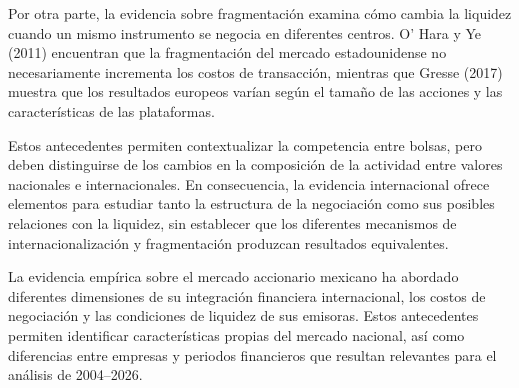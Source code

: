 Por otra parte, la evidencia sobre fragmentación examina cómo cambia la liquidez cuando un mismo instrumento se negocia en diferentes centros. O' Hara y Ye (2011) encuentran que la fragmentación del mercado estadounidense no necesariamente incrementa los costos de transacción, mientras que Gresse (2017) muestra que los resultados europeos varían según el tamaño de las acciones y las características de las plataformas.

Estos antecedentes permiten contextualizar la competencia entre bolsas, pero deben distinguirse de los cambios en la composición de la actividad entre valores nacionales e internacionales. En consecuencia, la evidencia internacional ofrece elementos para estudiar tanto la estructura de la negociación como sus posibles relaciones con la liquidez, sin establecer que los diferentes mecanismos de internacionalización y fragmentación produzcan resultados equivalentes.


La evidencia empírica sobre el mercado accionario mexicano ha abordado diferentes dimensiones de su integración financiera internacional, los costos de negociación y las condiciones de liquidez de sus emisoras. Estos antecedentes permiten identificar características propias del mercado nacional, así como diferencias entre empresas y periodos financieros que resultan relevantes para el análisis de 2004--2026.


